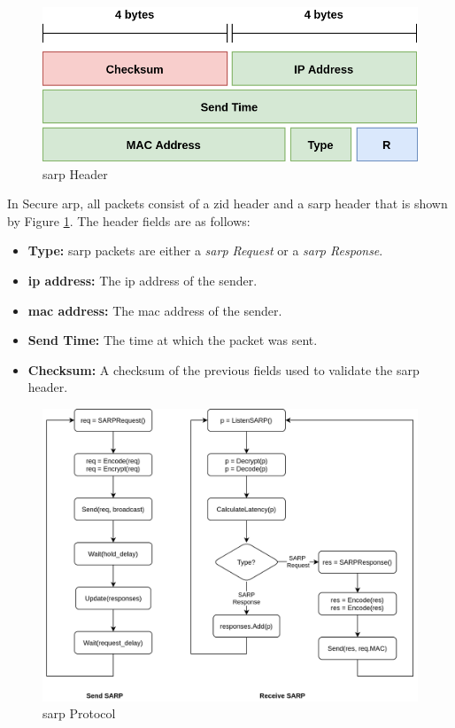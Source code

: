 \begin{figure}[!htb]
    \centering
    \includegraphics[width=0.8\linewidth]{images/sarp_header.png}
    \caption{\acrshort{sarp} Header}
    \label{fig:sarp-header}
\end{figure}
In Secure \acrshort{arp}, all packets consist of a \acrshort{zid} header and a \acrshort{sarp} header that is shown by Figure \ref{fig:sarp-header}. The header fields are as follows:
\begin{itemize}[itemsep=1pt, topsep=5pt]
    \item \textbf{Type:} \acrshort{sarp} packets are either a \textit{\acrshort{sarp} Request} or a \textit{\acrshort{sarp} Response}.
    \item \textbf{\acrshort{ip} address:} The \acrshort{ip} address of the sender.
    \item \textbf{\acrshort{mac} address:} The \acrshort{mac} address of the sender.
    \item \textbf{Send Time:} The time at which the packet was sent.
    \item \textbf{Checksum:} A checksum of the previous fields used to validate the \acrshort{sarp} header.
\end{itemize}

\begin{figure}[!htb]
    \centering
    \includegraphics[width=\linewidth]{images/sarp_flowchart.png}
    \caption{\acrshort{sarp} Protocol}
    \label{fig:sarp-flowchart}
\end{figure}

